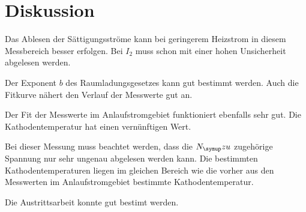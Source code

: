 \section{Diskussion}
\label{sec:Diskussion}

Das Ablesen der Sättigungsströme kann bei geringerem Heizstrom
in diesem Messbereich besser erfolgen. Bei $I_2$
muss schon mit einer hohen Unsicherheit abgelesen werden.

Der Exponent $b$ des Raumladungsgesetzes kann gut bestimmt werden.
Auch die Fitkurve nähert den Verlauf der Messwerte gut an.

Der Fit der Messwerte im Anlaufstromgebiet funktioniert ebenfalls
sehr gut. Die Kathodentemperatur hat einen vernünftigen Wert.

Bei dieser Messung muss beachtet werden, dass die $N_\g{zu}$ zugehörige
Spannung nur sehr ungenau abgelesen werden kann. Die bestimmten
Kathodentemperaturen liegen im gleichen Bereich wie die vorher aus den
Messwerten im Anlaufstromgebiet bestimmte Kathodentemperatur.

Die Austrittsarbeit konnte gut bestimt werden. 
